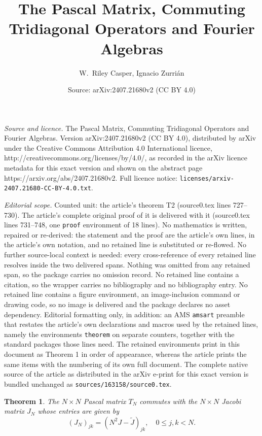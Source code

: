 \documentclass[10pt,a4paper]{amsart}
\title{The Pascal Matrix, Commuting Tridiagonal Operators and Fourier Algebras}
\author{W.~Riley Casper, Ignacio Zurri\'an}
\date{Source: arXiv:2407.21680v2 (CC BY 4.0)}
\newtheorem{theorem}{Theorem}
\def \wt {\widetilde}
\begin{document}
\maketitle

\noindent\emph{Source and licence.} The Pascal Matrix, Commuting Tridiagonal Operators and Fourier Algebras. Version arXiv:2407.21680v2 (CC BY 4.0), distributed by arXiv under the Creative Commons Attribution 4.0 International licence, http://creativecommons.org/licenses/by/4.0/, as recorded in the arXiv licence metadata for this exact version and shown on the abstract page https://arxiv.org/abs/2407.21680v2. Full licence notice: \texttt{licenses/arxiv-2407.21680-CC-BY-4.0.txt}.\par\smallskip

\noindent\textit{Editorial scope.} Counted unit: the article's theorem T2 (source0.tex lines 727--730). The article's complete original proof of it is delivered with it (source0.tex lines 731--748, one \texttt{proof} environment of 18 lines). No mathematics is written, repaired or re-derived: the statement and the proof are the article's own lines, in the article's own notation, and no retained line is substituted or re-flowed.  No further source-local context is needed: every cross-reference of every retained line resolves inside the two delivered spans.  Nothing was omitted from any retained span, so the package carries no omission record.  No retained line contains a citation, so the wrapper carries no bibliography and no bibliography entry.  No retained line contains a figure environment, an image-inclusion command or drawing code, so no image is delivered and the package declares no asset dependency.  Editorial formatting only, in addition: an AMS \texttt{amsart} preamble that restates the article's own declarations and macros used by the retained lines, namely the environments \texttt{theorem} on separate counters, together with the standard packages those lines need.  The retained environments print in this document as Theorem 1 in order of appearance, whereas the article prints the same items with the numbering of its own full document.  The complete native source of the article as distributed in the arXiv e-print for this exact version is bundled unchanged as \texttt{sources/163158/source0.tex}.
\begin{theorem}\label{T2}
The $N\times N$ Pascal matrix $T_N$ commutes with the $N\times N$ Jacobi matrix $J_N$ whose entries are given by
$$(J_N)_{jk} = (N^2J - \wt J)_{jk},\quad 0\leq j,k < N.$$
\end{theorem}
\end{document}
